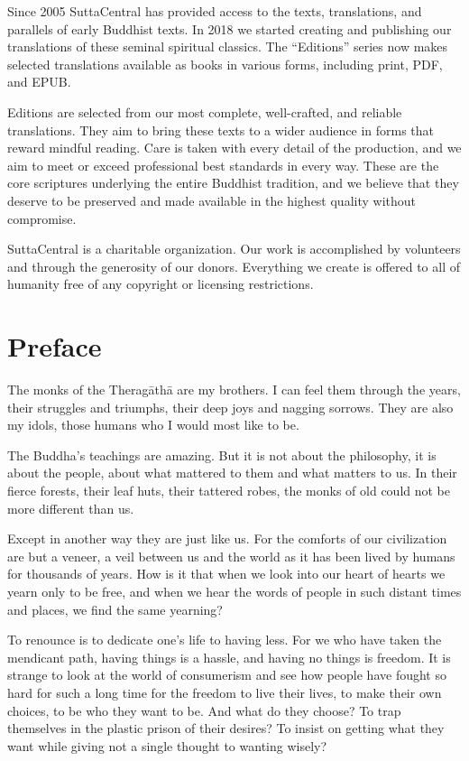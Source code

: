 \documentclass[12pt,openany]{book}%
\begin{document}
Since 2005 SuttaCentral has provided access to the texts, translations, and parallels of early Buddhist texts. In 2018 we started creating and publishing our translations of these seminal spiritual classics. The “Editions” series now makes selected translations available as books in various forms, including print, PDF, and EPUB.

Editions are selected from our most complete, well-crafted, and reliable translations. They aim to bring these texts to a wider audience in forms that reward mindful reading. Care is taken with every detail of the production, and we aim to meet or exceed professional best standards in every way. These are the core scriptures underlying the entire Buddhist tradition, and we believe that they deserve to be preserved and made available in the highest quality without compromise.

SuttaCentral is a charitable organization. Our work is accomplished by volunteers and through the generosity of our donors. Everything we create is offered to all of humanity free of any copyright or licensing restrictions. 

%
\chapter*{Preface}

The monks of the \textsanskrit{Theragāthā} are my brothers. I can feel them through the years, their struggles and triumphs, their deep joys and nagging sorrows. They are also my idols, those humans who I would most like to be. 

The Buddha’s teachings are amazing. But it is not about the philosophy, it is about the people, about what mattered to them and what matters to us. In their fierce forests, their leaf huts, their tattered robes, the monks of old could not be more different than us.

Except in another way they are just like us. For the comforts of our civilization are but a veneer, a veil between us and the world as it has been lived by humans for thousands of years. How is it that when we look into our heart of hearts we yearn only to be free, and when we hear the words of people in such distant times and places, we find the same yearning?

To renounce is to dedicate one’s life to having less. For we who have taken the mendicant path, having things is a hassle, and having no things is freedom. It is strange to look at the world of consumerism and see how people have fought so hard for such a long time for the freedom to live their lives, to make their own choices, to be who they want to be. And what do they choose? To trap themselves in the plastic prison of their desires? To insist on getting what they want while giving not a single thought to wanting wisely? 
\end{document}
